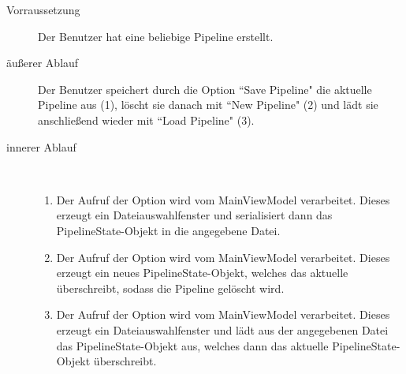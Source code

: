 \begin{description}
	\item[Vorraussetzung] Der Benutzer hat eine beliebige Pipeline erstellt.
	\item[äußerer Ablauf] Der Benutzer speichert durch die Option ``Save Pipeline" die aktuelle Pipeline aus (1), löscht sie danach mit  ``New Pipeline" (2) und lädt sie anschließend wieder mit ``Load Pipeline" (3).
	\item[innerer Ablauf] ~\newline
\begin{enumerate}
	\item Der Aufruf der Option wird vom MainViewModel verarbeitet. Dieses erzeugt ein Dateiauswahlfenster und serialisiert dann das PipelineState-Objekt in die angegebene Datei.
	\item Der Aufruf der Option wird vom MainViewModel verarbeitet. Dieses erzeugt ein neues PipelineState-Objekt, welches das aktuelle überschreibt, sodass die Pipeline gelöscht wird.
	\item Der Aufruf der Option wird vom MainViewModel verarbeitet. Dieses erzeugt ein Dateiauswahlfenster und lädt aus der angegebenen Datei das PipelineState-Objekt aus, welches dann das aktuelle PipelineState-Objekt überschreibt. 
\end{enumerate}
\end{description}
